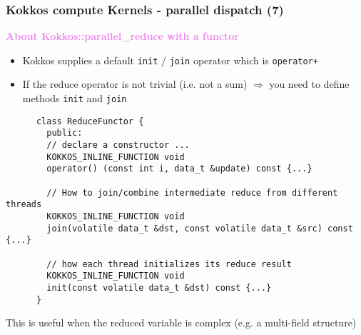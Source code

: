 \begin{frame}[fragile=singleslide]
  \frametitle{Kokkos compute Kernels - parallel dispatch (7)}

  {\large \textcolor{violet}{\textbf{About Kokkos::parallel\_reduce with a functor}}}

  \begin{itemize}
  \item Kokkos supplies a default \texttt{init} / \texttt{join} operator which is \texttt{operator+}
  \item If the reduce operator is not trivial (i.e. not a sum) $\Rightarrow$ you need to define methods \texttt{init} and \texttt{join}
  \end{itemize}

  {\footnotesize
    \begin{verbatim}
      class ReduceFunctor {
        public:
        // declare a constructor ...
        KOKKOS_INLINE_FUNCTION void 
        operator() (const int i, data_t &update) const {...}

        // How to join/combine intermediate reduce from different threads
        KOKKOS_INLINE_FUNCTION void 
        join(volatile data_t &dst, const volatile data_t &src) const {...}

        // how each thread initializes its reduce result
        KOKKOS_INLINE_FUNCTION void 
        init(const volatile data_t &dst) const {...}
      }
      \end{verbatim}
      This is useful when the reduced variable is complex (e.g. a multi-field structure)
    }
\end{frame}

